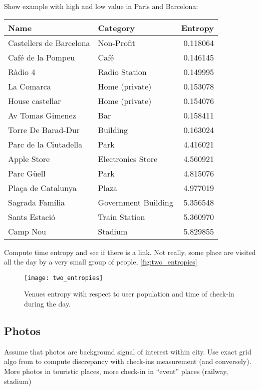 Show example with high and low value in Paris and Barcelona:
\begin{tabular}{llr}
	\toprule
	Name                    & Category            & Entropy \\
	\midrule
	Castellers de Barcelona & Non-Profit          & 0.118064 \\
	Café de la Pompeu       & Café                & 0.146145 \\
	Ràdio 4                 & Radio Station       & 0.149995 \\
	La Comarca              & Home (private)      & 0.153078 \\
	House castellar         & Home (private)      & 0.154076 \\
	Av Tomas Gimenez        & Bar                 & 0.158411 \\
	Torre De Barad-Dur      & Building            & 0.163024 \\
	\midrule
	Parc de la Ciutadella   & Park                & 4.416021 \\
	Apple Store             & Electronics Store   & 4.560921 \\
	Parc Güell              & Park                & 4.815076 \\
	Plaça de Catalunya      & Plaza               & 4.977019 \\
	Sagrada Família         & Government Building & 5.356548 \\
	Sants Estació           & Train Station       & 5.360970 \\
	Camp Nou                & Stadium             & 5.829855 \\
	\bottomrule
\end{tabular}

Compute time entropy and see if there is a link. Not really, some place are
visited all the day by a very small group of people,
\autoref{fig:two_entropies}

\begin{figure}[hbtp]
\texttt{[image: two\_entropies]}
\caption{Venues entropy with respect to user population and time of check-in
during the day. \label{fig:two_entropies}}
\end{figure}


\subsection{Photos}

Assume that photos are background signal of interest within city. Use exact
grid algo from \autocite{Agarwal2006spatial} to compute discrepancy with
check-ins measurement (and conversely).  More
photos in touristic places, more check-in in “event” places (railway, stadium)

